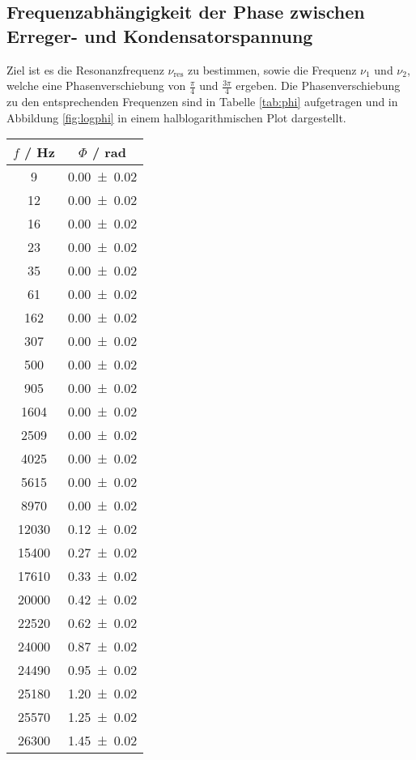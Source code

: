 \subsection{Frequenzabhängigkeit der Phase zwischen Erreger- und Kondensatorspannung}
Ziel ist es die Resonanzfrequenz $\nu_\text{res}$ zu bestimmen, sowie die Frequenz $\nu_1$ und $\nu_2$, welche eine Phasenverschiebung von $\frac{\pi}{4}$ und $\frac{3 \pi}{4}$ ergeben. Die Phasenverschiebung zu den entsprechenden Frequenzen sind in Tabelle \ref{tab:phi} aufgetragen und in Abbildung \ref{fig:logphi} in einem halblogarithmischen Plot dargestellt.
\begin{table}
  \centering
  \begin{tabular}{c c}
	\toprule
	$f$ / Hz & $\Phi$ / rad \\
	\midrule
	9   	& \num{0.00 +- 0.02} \\
	12  	& \num{0.00 +- 0.02} \\
	16  	& \num{0.00 +- 0.02} \\
	23  	& \num{0.00 +- 0.02} \\
	35  	& \num{0.00 +- 0.02} \\
	61  	& \num{0.00 +- 0.02} \\
	162 	& \num{0.00 +- 0.02} \\
	307	& \num{0.00 +- 0.02} \\
	500 	& \num{0.00 +- 0.02} \\
	905 	& \num{0.00 +- 0.02} \\
	1604 	& \num{0.00 +- 0.02} \\
	2509 	& \num{0.00 +- 0.02} \\
	4025 	& \num{0.00 +- 0.02} \\
	5615 	& \num{0.00 +- 0.02} \\
	8970 	& \num{0.00 +- 0.02} \\
	12030	& \num{0.12 +- 0.02} \\
	15400 	& \num{0.27 +- 0.02} \\
	17610 	& \num{0.33 +- 0.02} \\
	20000 	& \num{0.42 +- 0.02} \\
	22520 	& \num{0.62 +- 0.02} \\
	24000 	& \num{0.87 +- 0.02} \\
	24490 	& \num{0.95 +- 0.02} \\
	25180 	& \num{1.20 +- 0.02} \\
	25570 	& \num{1.25 +- 0.02} \\
	26300 	& \num{1.45 +- 0.02} \\

\end{tabular}
\end{table}
